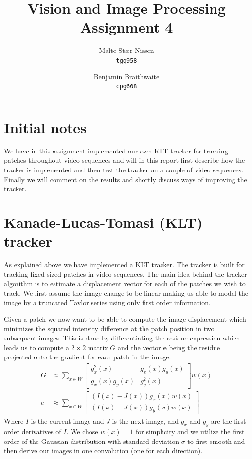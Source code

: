 \documentclass[11pt,a4paper]{article}
\title{Vision and Image Processing\\Assignment 4}
\author{Malte Stær Nissen    \\ \texttt{tgq958} \and
        Benjamin Braithwaite \\ \texttt{cpg608}}
\begin{document}
\maketitle

\section{Initial notes}
%
We have in this assignment implemented our own KLT tracker for tracking patches
throughout video sequences and will in this report first describe how the
tracker is implemented and then test the tracker on a couple of video sequences.
Finally we will comment on the results and shortly discuss ways of improving the
tracker.
%
\section{Kanade-Lucas-Tomasi (KLT) tracker}
%
As explained above we have implemented a KLT tracker. The tracker is built for
tracking fixed sized patches in video sequences. The main idea behind the
tracker algorithm is to estimate a displacement vector for each of the patches we
wish to track. We first assume the image change to be linear making us able to
model the image by a truncated Taylor series using only first order information.

Given a patch we now want to be able to compute the image displacement which
minimizes the squared intensity difference at the patch position in two
subsequent images. This is done by differentiating the residue expression which
leads us to compute a $2\times2$ matrix $G$ and the vector $\boldsymbol{e}$ being the residue
projected onto the gradient for each patch in the image.
\begin{align*}
    G &\approx \sum_{x \in W}
        \begin{bmatrix}
                g_x^2(x)      & g_x(x) g_y(x) \\
                g_x(x) g_y(x) & g_y^2(x)
        \end{bmatrix} w(x) \\
    e &\approx \sum_{x \in W}
    \begin{bmatrix}
        (I(x) - J(x)) g_x(x) w(x) \\
        (I(x) - J(x)) g_y(x) w(x)
    \end{bmatrix}
\end{align*}
Where $I$ is the current image and $J$ is the next image, and $g_x$ and
$g_y$ are the first order derivatives of $I$. We chose $w(x) = 1$ for
simplicity and we utilize the first order of the Gaussian distribution with
standard deviation $\sigma$ to first smooth and then derive our images in one
convolution (one for each direction).
\end{document}
